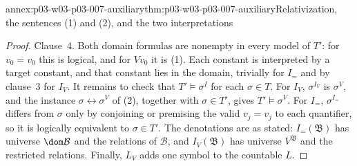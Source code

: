 \begin{annexitem}{annex:p03-w03-p03-007-auxiliary}{thm:p03-w03-p03-007-auxiliary}{Relativization, the sentences (1) and (2), and the two interpretations}
\begin{proof}
Clause~4. Both domain formulas are nonempty in every model of \(T'\): for
\(v_0=v_0\) this is logical, and for \(Vv_0\) it is (1). Each constant is
interpreted by a target constant, and that constant lies in the domain,
trivially for \(I_=\) and by clause~3 for \(I_V\). It remains to check that
\(T'\models\sigma^I\) for each \(\sigma\in T\). For \(I_V\), \(\sigma^{I_V}\)
is \(\sigma^V\), and the instance \(\sigma\leftrightarrow\sigma^V\) of (2),
together with \(\sigma\in T'\), gives \(T'\models\sigma^V\). For \(I_=\),
\(\sigma^{I_=}\) differs from \(\sigma\) only by conjoining or premising the
valid \(v_j=v_j\) to each quantifier, so it is logically equivalent to
\(\sigma\in T'\). The denotations are as stated: \(I_=(\mathfrak B)\) has
universe \(\dom\mathcal B\) and the relations of \(\mathcal B\), and
\(I_V(\mathfrak B)\) has universe \(V^{\mathfrak B}\) and the restricted
relations. Finally, \(L_V\) adds one symbol to the countable \(L\).
\end{proof}
\end{annexitem}

